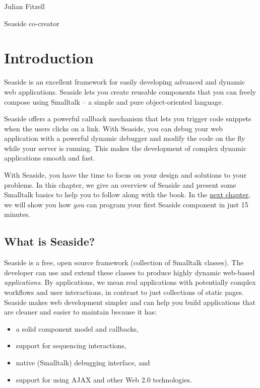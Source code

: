 \documentclass[a4paper,10pt,twoside]{book}
\begin{document}
\begin{list}{}{}
\item  Julian Fitzell
\item  Seaside co-creator
\end{list}

\chapter{Introduction}
\label{book:introduction}

Seaside is an excellent framework for easily developing advanced and dynamic web applications. Seaside lets you create reusable components that you can freely compose using Smalltalk -- a simple and pure object-oriented language. 

Seaside offers a powerful callback mechanism that lets you trigger code snippets when the users clicks on a link. With Seaside, you can debug your web application with a powerful dynamic debugger and modify the code on the fly while your server is running. This makes the development of complex dynamic applications smooth and fast. 

With Seaside, you have the time to focus on your design and solutions to your problems. In this chapter, we give an overview of Seaside and present some Smalltalk basics to help you to follow along with the book. In the \hyperref[book:gettingstarted]{next chapter}, we will show you how \textit{you} can program your first Seaside component in just 15 minutes.

\section{What is Seaside?}
\label{book:introduction:whatisseaside}

 Seaside is a free, open source framework (collection of Smalltalk classes). The developer can use and extend these classes to produce highly dynamic web-based \textit{applications}. By applications, we mean real applications with potentially complex workflows and user interactions, in contrast to just collections of static pages. Seaside makes web development simpler and can help you build applications that are cleaner and easier to maintain because it has:

\begin{itemize}
\item  a solid component model and callbacks,
\item  support for sequencing interactions,
\item  native (Smalltalk) debugging interface, and
\item  support for using AJAX and other Web 2.0 technologies.
\end{itemize}
\end{document}
